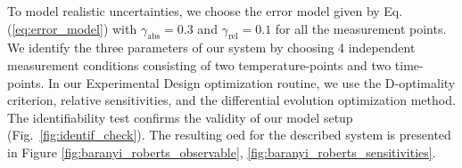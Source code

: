 \documentclass[10pt,A4paper]{article}
\begin{document}
To model realistic uncertainties, we choose the error model given by Eq. (\ref{eq:error_model}) with $\gamma_\text{abs}=0.3$ and $\gamma_\text{rel}=0.1$ for all the measurement points.
We identify the three parameters of our system by choosing 4 independent measurement conditions consisting of two temperature-points and two time-points.
In our Experimental Design optimization routine, we use the D-optimality criterion, relative sensitivities, and the differential evolution optimization method.
The identifiability test confirms the validity of our model setup (Fig.~\ref{fig:identif_check}).
The resulting \ac{oed} for the described system is presented in Figure \ref{fig:baranyi_roberts_observable}, \ref{fig:baranyi_roberts_sensitivities}.
%
%
\end{document}
